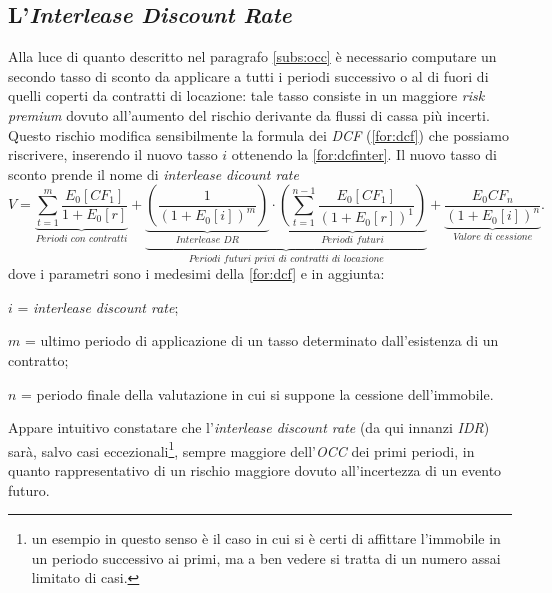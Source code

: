 \subsection{L'{\itshape Interlease Discount Rate}}
\label{subs:idr}
Alla luce di quanto descritto nel paragrafo \ref{subs:occ} è necessario computare un secondo tasso di sconto da applicare a tutti i periodi successivo o al di fuori di quelli coperti da contratti di locazione: tale tasso consiste in un maggiore {\itshape risk premium} dovuto all'aumento del rischio derivante da flussi di cassa più incerti.
Questo rischio modifica sensibilmente la formula dei \textit{DCF} (\ref{for:dcf}) che possiamo riscrivere, inserendo il nuovo tasso $i$ ottenendo la \ref{for:dcfinter}.
Il nuovo tasso di sconto prende il nome di {\itshape interlease dicount rate}
\begin{equation}
V = \underbrace{\sum_{t=1}^{m} \frac{E_0[CF_1]}{1+E_0[r]}}_\textit{Periodi con contratti} + \underbrace{\underbrace{\left(\frac{1}{(1+E_0[i])^m}\right)}_\textit{Interlease DR} \cdot \underbrace{\left(\sum_{t=1}^{n-1} \frac{E_0[CF_{1}]}{(1+E_0[r])^{1}} \right)}_\textit{Periodi futuri}}_\textit{Periodi futuri privi di contratti di locazione} + \underbrace{\frac{E_0{CF_n}}{(1+E_0[i])^n}}_\textit{Valore di cessione} .
\label{for:dcfinter}
\end{equation}
dove i parametri sono i medesimi della \ref{for:dcf} e in aggiunta:
\begin{description}
\item $ i $ = {\itshape interlease discount rate};
\item $ m $ = ultimo periodo di applicazione di un tasso determinato dall'esistenza di un  contratto;
\item $ n $ = periodo finale della valutazione in cui si suppone la cessione dell'immobile.
\end{description}
Appare intuitivo constatare che l'{\itshape interlease discount rate} (da qui innanzi {\itshape IDR}) sarà, salvo casi eccezionali\footnote{un esempio in questo senso è il caso in cui si è certi di affittare l'immobile in un periodo successivo ai primi, ma a ben vedere si tratta di un numero assai limitato di casi.}, sempre maggiore dell'\textit{OCC} dei primi periodi, in quanto rappresentativo di un rischio maggiore dovuto all'incertezza di un evento futuro.

